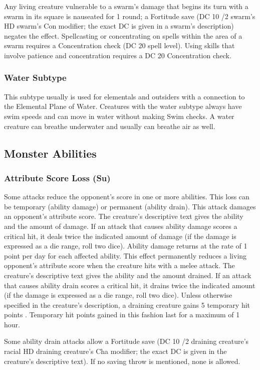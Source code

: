 { Any living creature vulnerable to a swarm's damage that begins its turn with a swarm in its square is nauseated for 1 round; a Fortitude save (DC 10 /2 swarm's HD \add swarm's Con modifier; the exact DC is given in a swarm's description) negates the effect. Spellcasting or concentrating on spells within the area of a swarm requires a Concentration check (DC 20 \add {} spell level). Using skills that involve patience and concentration requires a DC 20 Concentration check.

\subsubsection{Water Subtype} This subtype usually is used for elementals and outsiders with a connection to the Elemental Plane of Water. Creatures with the water subtype always have swim speeds and can move in water without making Swim checks. A water creature can breathe underwater and usually can breathe air as well.

\subsection{Monster Abilities}

\subsubsection{Attribute Score Loss (Su)} Some attacks reduce the opponent's score in one or more abilities. This loss can be temporary (ability damage) or permanent (ability drain).
 This attack damages an opponent's attribute score. The creature's descriptive text gives the ability and the amount of damage. If an attack that causes ability damage scores a critical hit, it deals twice the indicated amount of damage (if the damage is expressed as a die range, roll two dice). Ability damage returns at the rate of 1 point per day for each affected ability.
 This effect permanently reduces a living opponent's attribute score when the creature hits with a melee attack. The creature's descriptive text gives the ability and the amount drained. If an attack that causes ability drain scores a critical hit, it drains twice the indicated amount (if the damage is expressed as a die range, roll two dice). Unless otherwise specified in the creature's description, a draining creature gains 5 temporary hit points . Temporary hit points gained in this fashion last for a maximum of 1 hour.
\par Some ability drain attacks allow a Fortitude save (DC 10 /2 draining creature's racial HD \add draining creature's Cha modifier; the exact DC is given in the creature's descriptive text). If no saving throw is mentioned, none is allowed.

}
